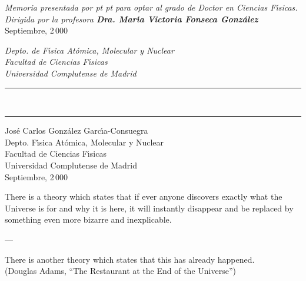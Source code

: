 \thispagestyle{empty}  

\mbox{} \vskip 50pt

\begin{center}
  {\Huge \sffamily \bfseries \sc \mititulo}
  \vskip 80pt
  {\large \itshape
    Memoria presentada por   pt
    {\Large \bfseries \rm \yo}   pt
    para optar al grado de Doctor en Ciencias F{\'{\i}}sicas. \vskip 40pt
    Dirigida por la profesora \vskip 25pt
    {\Large \bfseries \rm Dra. Mar{\'{\i}}a Victoria Fonseca Gonz{\'{a}}lez}
    } \vskip 45pt
  {\Large \rm Septiembre, 2\,000 \\} \vskip 45pt
  
  {\it \small
    Depto. de F{\'{\i}}sica At{\'{o}}mica, Molecular y Nuclear\\
    Facultad de Ciencias F{\'{\i}}sicas\\
    Universidad Complutense de Madrid\\
    }  
\end{center}

\echapter %

\thispagestyle{empty}  

\vspace*{2cm}
\begin{flushright}
  \rule{.7\linewidth}{1pt}\\
  \Large \mititulo
  \rule{.7\linewidth}{1pt}
\end{flushright}
\vspace*{6cm}
\begin{flushright}
  \large 
Jos{\'{e}} Carlos Gonz{\'{a}}lez Garc{\'{\i}}a-Consuegra\\[15 mm]
Depto. F{\'{\i}}sica At{\'{o}}mica, Molecular y Nuclear\\
Facultad de Ciencias F{\'{\i}}sicas\\
Universidad Complutense de Madrid\\[15 mm]
Septiembre, 2\,000
\end{flushright}

\echapter %

\thispagestyle{empty}  

\vspace*{2cm} 
%
\hfill 
\parbox[b]{0.65\linewidth}{ 
%
\itshape
%
\raggedright
%
There is a theory which states that if ever anyone discovers exactly
what the Universe is for and why it is here, it will instantly
disappear and be replaced by something even more bizarre and
inexplicable. \\
%
\vspace{5pt}
\centerline{---}
\vspace{5pt}
%
There is another theory which states that this has already happened. \\
%
\vspace{15pt}
%
\upshape
%
\raggedleft
%
{\footnotesize (Douglas Adams, ``The Restaurant at the End of the
  Universe'')}
%
} 

\echapter %

\endinput
%

